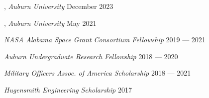 
, \textit{Auburn University}	\hfill December 2023

, \textit{Auburn University} \hfill	May 2021

\textit{NASA Alabama Space Grant Consortium Fellowship} 	\hfill 2019 --- 2021

\textit{Auburn Undergraduate Research Fellowship} \hfill	2018 --- 2020

\textit{Military Officers Assoc{.} of America Scholarship} \hfill	2018 --- 2021

\textit{Hugensmith Engineering Scholarship} \hfill	2017




